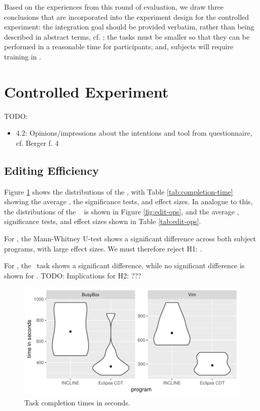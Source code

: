 Based on the experiences from this round of evaluation, we draw three conclusions that are incorporated into the experiment design for the controlled experiment: the integration goal should be provided verbatim, rather than being described in abstract terms, cf. \cite{berger2016mps}; the tasks must be smaller so that they can be performed in a reasonable time for participants; and, subjects will require training in \tooln.


\section{Controlled Experiment}
TODO:
\begin{itemize}
    \item 4.2: Opinions/impressions about the intentions and tool from questionnaire, cf. Berger f. 4
\end{itemize}

\subsection{Editing Efficiency}
Figure \ref{fig:completion-times} shows the distributions of the \ctimes, with Table \ref{tab:completion-time} showing the average \ctimes, the significance tests, and effect sizes. In analogue to this, the distributions of the \eops~ is shown in Figure \ref{fig:edit-ops}, and the average \eops, significance tests, and effect sizes shown in Table \ref{tab:edit-ops}.

For \ctimes, the Mann-Whitney U-test shows a significant difference across both subject programs, with large effect sizes. We must therefore reject H1: \textit{\HA}.

For \eops, the \busybox~task shows a significant difference, while no significant difference is shown for \vim. TODO: Implications for H2: \textit{\HB}??? 

\begin{figure}[ht]
    \centering
    \includegraphics{figure/incl-violin-all.pdf}
    \caption{Task completion times in seconds.}
    \label{fig:completion-times}
\end{figure}

